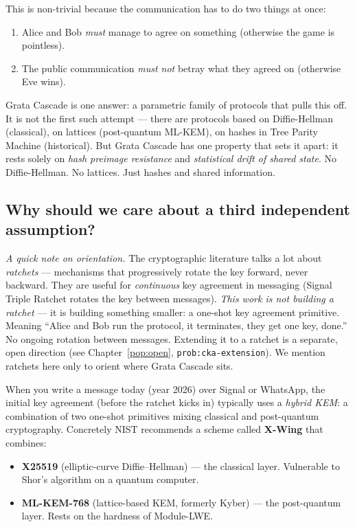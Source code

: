 \documentclass[11pt,a4paper]{article}
\begin{document}
This is non-trivial because the communication has to do two things at once:
\begin{enumerate}[leftmargin=*]
\item Alice and Bob \emph{must} manage to agree on something (otherwise the game is pointless).
\item The public communication \emph{must not} betray what they agreed on (otherwise Eve wins).
\end{enumerate}

Grata Cascade is one answer: a parametric family of protocols that pulls this off. It is not the first such attempt --- there are protocols based on Diffie-Hellman (classical), on lattices (post-quantum ML-KEM), on hashes in Tree Parity Machine (historical). But Grata Cascade has one property that sets it apart: it rests solely on \emph{hash preimage resistance} and \emph{statistical drift of shared state}. No Diffie-Hellman. No lattices. Just hashes and shared information.

\subsection{Why should we care about a third independent assumption?}\label{pop:why-third-assumption}

\noindent\emph{A quick note on orientation.} The cryptographic literature talks a lot about \emph{ratchets} --- mechanisms that progressively rotate the key forward, never backward. They are useful for \emph{continuous} key agreement in messaging (Signal Triple Ratchet rotates the key between messages). \emph{This work is not building a ratchet} --- it is building something smaller: a one-shot key agreement primitive. Meaning ``Alice and Bob run the protocol, it terminates, they get one key, done.'' No ongoing rotation between messages. Extending it to a ratchet is a separate, open direction (see Chapter~\ref{pop:open}, \texttt{prob:cka-extension}). We mention ratchets here only to orient where Grata Cascade sits.

\medskip
When you write a message today (year 2026) over Signal or WhatsApp, the initial key agreement (before the ratchet kicks in) typically uses a \emph{hybrid KEM}: a combination of two one-shot primitives mixing classical and post-quantum cryptography. Concretely NIST recommends a scheme called \textbf{X-Wing} that combines:

\begin{itemize}[leftmargin=*]
\item \textbf{X25519} (elliptic-curve Diffie--Hellman) --- the classical layer. Vulnerable to Shor's algorithm on a quantum computer.
\item \textbf{ML-KEM-768} (lattice-based KEM, formerly Kyber) --- the post-quantum layer. Rests on the hardness of Module-LWE.
\end{itemize}
\end{document}
